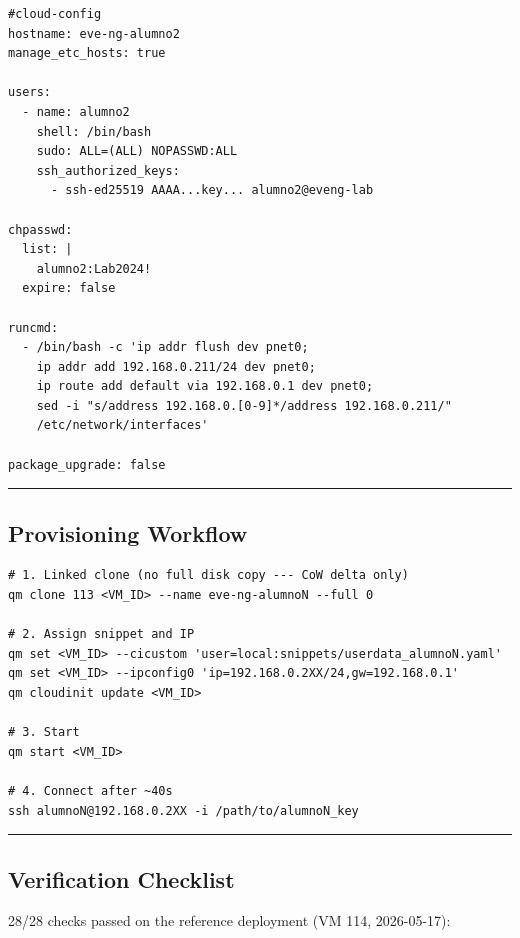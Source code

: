 \begin{lstlisting}
#cloud-config
hostname: eve-ng-alumno2
manage_etc_hosts: true

users:
  - name: alumno2
    shell: /bin/bash
    sudo: ALL=(ALL) NOPASSWD:ALL
    ssh_authorized_keys:
      - ssh-ed25519 AAAA...key... alumno2@eveng-lab

chpasswd:
  list: |
    alumno2:Lab2024!
  expire: false

runcmd:
  - /bin/bash -c 'ip addr flush dev pnet0;
    ip addr add 192.168.0.211/24 dev pnet0;
    ip route add default via 192.168.0.1 dev pnet0;
    sed -i "s/address 192.168.0.[0-9]*/address 192.168.0.211/"
    /etc/network/interfaces'

package_upgrade: false
\end{lstlisting}

\begin{center}\rule{0.5\linewidth}{0.5pt}\end{center}

\subsection{Provisioning Workflow}

\begin{lstlisting}
# 1. Linked clone (no full disk copy --- CoW delta only)
qm clone 113 <VM_ID> --name eve-ng-alumnoN --full 0

# 2. Assign snippet and IP
qm set <VM_ID> --cicustom 'user=local:snippets/userdata_alumnoN.yaml'
qm set <VM_ID> --ipconfig0 'ip=192.168.0.2XX/24,gw=192.168.0.1'
qm cloudinit update <VM_ID>

# 3. Start
qm start <VM_ID>

# 4. Connect after ~40s
ssh alumnoN@192.168.0.2XX -i /path/to/alumnoN_key
\end{lstlisting}

\begin{center}\rule{0.5\linewidth}{0.5pt}\end{center}

\subsection{Verification Checklist}

28/28 checks passed on the reference deployment (VM 114, 2026-05-17):

